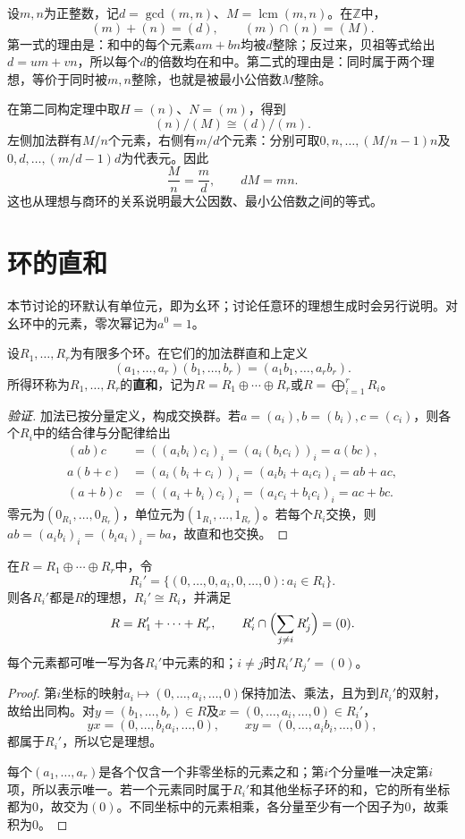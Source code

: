 \begin{example}
设$m,n$为正整数，记$d=\gcd(m,n)$、$M=\operatorname{lcm}(m,n)$。在$\mathbb Z$中，
\[
(m)+(n)=(d),\qquad(m)\cap(n)=(M).
\]
第一式的理由是：和中的每个元素$am+bn$均被$d$整除；反过来，贝祖等式给出$d=um+vn$，所以每个$d$的倍数均在和中。第二式的理由是：同时属于两个理想，等价于同时被$m,n$整除，也就是被最小公倍数$M$整除。

在第二同构定理中取$H=(n)$、$N=(m)$，得到
\[
(n)/(M)\cong(d)/(m).
\]
左侧加法群有$M/n$个元素，右侧有$m/d$个元素：分别可取$0,n,\ldots,(M/n-1)n$及$0,d,\ldots,(m/d-1)d$为代表元。因此
\[
\frac Mn=\frac md,\qquad dM=mn.
\]
这也从理想与商环的关系说明最大公因数、最小公倍数之间的等式。
\end{example}


\section{环的直和}

本节讨论的环默认有单位元，即为幺环；讨论任意环的理想生成时会另行说明。对幺环中的元素，零次幂记为$a^0=1$。

\begin{definition}\label{p2:concept:c3-ring-sum}
设$R_1,\ldots,R_r$为有限多个环。在它们的加法群直和上定义
\[
(a_1,\ldots,a_r)(b_1,\ldots,b_r)=(a_1b_1,\ldots,a_rb_r).
\]
所得环称为$R_1,\ldots,R_r$的\textbf{直和}，记为$R=R_1\oplus\cdots\oplus R_r$或$R=\bigoplus\limits_{i=1}^rR_i$。
\end{definition}
\begin{proof}[验证]
加法已按分量定义，构成交换群。若$a=(a_i),b=(b_i),c=(c_i)$，则各个$R_i$中的结合律与分配律给出
\begin{align*}
(ab)c&=((a_ib_i)c_i)_i=(a_i(b_ic_i))_i=a(bc),\\
a(b+c)&=(a_i(b_i+c_i))_i=(a_ib_i+a_ic_i)_i=ab+ac,\\
(a+b)c&=((a_i+b_i)c_i)_i=(a_ic_i+b_ic_i)_i=ac+bc.
\end{align*}
零元为$(0_{R_1},\ldots,0_{R_r})$，单位元为$(1_{R_1},\ldots,1_{R_r})$。若每个$R_i$交换，则$ab=(a_ib_i)_i=(b_ia_i)_i=ba$，故直和也交换。
\end{proof}

\begin{proposition}
在$R=R_1\oplus\cdots\oplus R_r$中，令
\[
R_i'=\{(0,\ldots,0,a_i,0,\ldots,0):a_i\in R_i\}.
\]
则各$R_i'$都是$R$的理想，$R_i'\cong R_i$，并满足
\[
R=R_1'+\cdots+R_r',\qquad
R_i'\cap\Bigl(\sum_{j\ne i}R_j'\Bigr)=(0).
\]
每个元素都可唯一写为各$R_i'$中元素的和；$i\ne j$时$R_i'R_j'=(0)$。
\end{proposition}
\begin{proof}
第$i$坐标的映射$a_i\mapsto(0,\ldots,a_i,\ldots,0)$保持加法、乘法，且为到$R_i'$的双射，故给出同构。对$y=(b_1,\ldots,b_r)\in R$及$x=(0,\ldots,a_i,\ldots,0)\in R_i'$，
\[
yx=(0,\ldots,b_ia_i,\ldots,0),\qquad
xy=(0,\ldots,a_ib_i,\ldots,0),
\]
都属于$R_i'$，所以它是理想。

每个$(a_1,\ldots,a_r)$是各个仅含一个非零坐标的元素之和；第$i$个分量唯一决定第$i$项，所以表示唯一。若一个元素同时属于$R_i'$和其他坐标子环的和，它的所有坐标都为0，故交为$(0)$。不同坐标中的元素相乘，各分量至少有一个因子为0，故乘积为0。
\end{proof}

